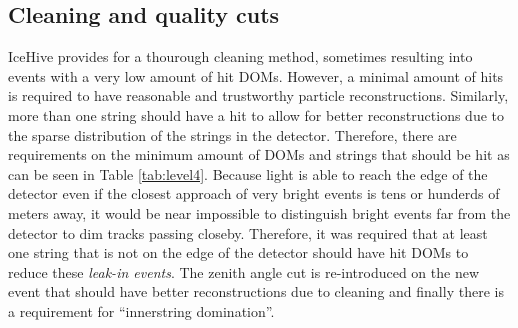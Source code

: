\begin{table}[]
\caption{Overview of quality cuts in Level 4.}
\label{tab:level4}
\end{table}

\subsection{Cleaning and quality cuts}
\noindent IceHive provides for a thourough cleaning method, sometimes resulting into events with a very low amount of hit DOMs. However, a minimal amount of hits is required to have reasonable and trustworthy particle reconstructions. Similarly, more than one string should have a hit to allow for better reconstructions due to the sparse distribution of the strings in the detector. Therefore, there are requirements on the minimum amount of DOMs and strings that should be hit as can be seen in Table \ref{tab:level4}. Because light is able to reach the edge of the detector even if the closest approach of very bright events is tens or hunderds of meters away, it would be near impossible to distinguish bright events far from the detector to dim tracks passing closeby. Therefore, it was required that at least one string that is not on the edge of the detector should have hit DOMs to reduce these \textit{leak-in events}.
The zenith angle cut is re-introduced on the new event that should have better reconstructions due to cleaning and finally there is a requirement for ``innerstring domination''.

